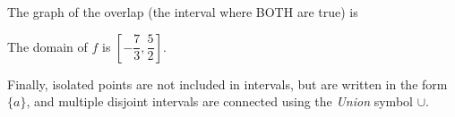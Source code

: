 \documentclass[nooutcomes]{ximera}
\begin{document}
\begin{example}
\begin{explanation}
			The graph of the overlap (the interval where BOTH are true) is
			\begin{image}
			\end{image}			
			
			The domain of $f$ is $\left[ -\dfrac{7}{3} , \dfrac{5}{2} \right]$.
		\end{explanation}
	\end{example}


	Finally, isolated points are not included in intervals, but are written in the form $\{ a \}$, and multiple disjoint intervals are connected using the \emph{Union} symbol $\cup$.
\end{document}

